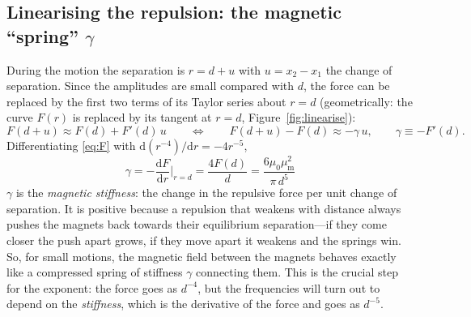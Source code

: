 \documentclass[11pt,a4paper]{article}
\newcommand{\muz}{\mu_0}
\newcommand{\mum}{\mu_{\mathrm m}}
\newcommand{\dd}{\mathrm{d}}
\begin{document}
\subsection{Linearising the repulsion: the magnetic ``spring'' $\gamma$}\label{sec:linearise}

During the motion the separation is $r=d+u$ with $u=x_2-x_1$ the change of separation. Since the amplitudes are small compared with $d$, the force can be replaced by the first two terms of its Taylor series about $r=d$ (geometrically: the curve $F(r)$ is replaced by its tangent at $r=d$, Figure~\ref{fig:linearise}):
\begin{equation}
F(d+u)\approx F(d)+F'(d)\,u
\qquad\Longleftrightarrow\qquad
F(d+u)-F(d)\approx-\gamma\,u,\qquad \gamma\equiv-F'(d).
\label{eq:taylor}
\end{equation}
Differentiating \eqref{eq:F} with $\dd(r^{-4})/\dd r=-4r^{-5}$,
\begin{equation}
\boxed{\;\gamma=-\frac{\dd F}{\dd r}\bigg|_{r=d}=\frac{4F(d)}{d}=\frac{6\muz\mum^2}{\pi\,d^5}\;}
\label{eq:gamma}
\end{equation}
$\gamma$ is the \emph{magnetic stiffness}: the change in the repulsive force per unit change of separation. It is positive because a repulsion that weakens with distance always pushes the magnets back towards their equilibrium separation---if they come closer the push apart grows, if they move apart it weakens and the springs win. So, for small motions, the magnetic field between the magnets behaves exactly like a compressed spring of stiffness $\gamma$ connecting them. This is the crucial step for the exponent: the force goes as $d^{-4}$, but the frequencies will turn out to depend on the \emph{stiffness}, which is the derivative of the force and goes as $d^{-5}$.
\end{document}
